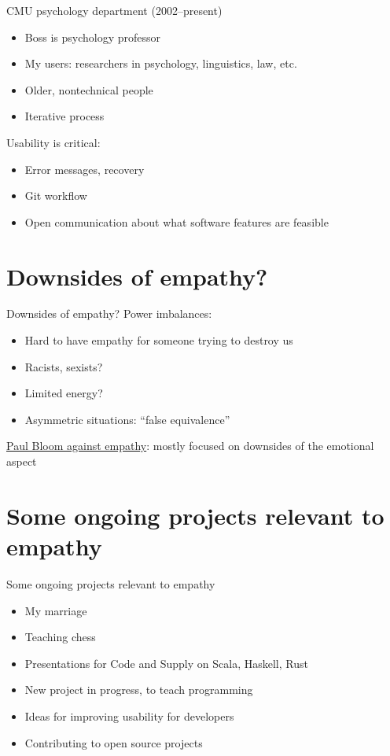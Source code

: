 \begin{frame}{CMU psychology department (2002--present)}
  \begin{itemize}
  \item Boss is psychology professor
  \item My users: researchers in psychology, linguistics, law, etc.
  \item Older, nontechnical people
  \item Iterative process
  \end{itemize}

  Usability is critical:
  \begin{itemize}
  \item Error messages, recovery
  \item Git workflow
  \item Open communication about what software features are feasible
  \end{itemize}
\end{frame}



\section{Downsides of empathy?}

\begin{frame}{Downsides of empathy?}
  Power imbalances:
  \begin{itemize}
  \item Hard to have empathy for someone trying to destroy us
  \item Racists, sexists?
  \item Limited energy?
  \item Asymmetric situations: ``false equivalence''
  \end{itemize}

  \href{http://www.bostonreview.net/forum/paul-bloom-against-empathy}{Paul
    Bloom against empathy}: mostly focused on downsides of the emotional aspect
\end{frame}

\section{Some ongoing projects relevant to empathy}

\begin{frame}{Some ongoing projects relevant to empathy}
  \begin{itemize}
  \item My marriage
  \item Teaching chess
  \item Presentations for Code and Supply on Scala, Haskell, Rust
  \item New project in progress, to teach programming
  \item Ideas for improving usability for developers
  \item Contributing to open source projects
  \end{itemize}
\end{frame}



